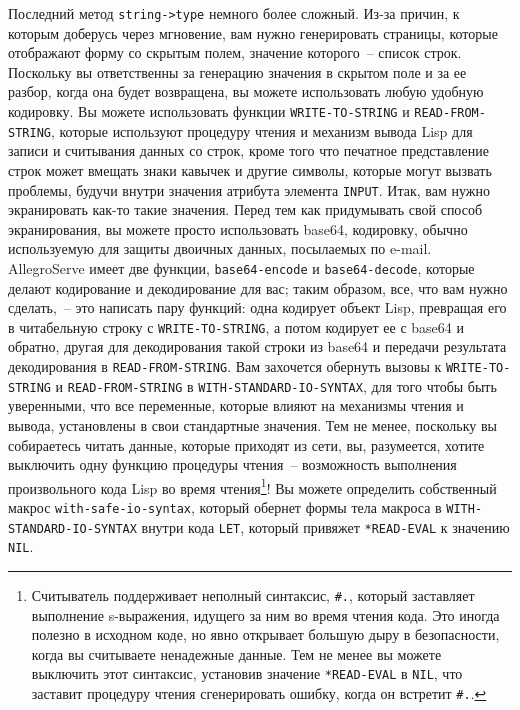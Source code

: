 Последний метод \lstinline{string->type}  немного более сложный. Из-за причин, к которым доберусь
через мгновение, вам нужно генерировать страницы, которые отображают форму со скрытым
полем, значение которого~-- список строк. Поскольку вы ответственны за генерацию значения в
скрытом поле и за ее разбор, когда она будет возвращена, вы можете использовать любую
удобную кодировку. Вы можете использовать функции \lstinline{WRITE-TO-STRING} и
\lstinline{READ-FROM-STRING}, которые используют процедуру чтения и механизм вывода Lisp для записи
и считывания данных со строк, кроме того что печатное представление строк может вмещать
знаки кавычек и другие символы, которые могут вызвать проблемы, будучи внутри значения
атрибута элемента \lstinline{INPUT}. Итак, вам нужно экранировать как-то такие значения. Перед
тем как придумывать свой способ экранирования, вы можете просто использовать base64,
кодировку, обычно используемую для защиты двоичных данных, посылаемых по e-mail. AllegroServe
имеет две функции, \lstinline{base64-encode} и \lstinline{base64-decode}, которые делают кодирование
и декодирование для вас; таким образом, все, что вам нужно сделать,~-- это написать пару
функций: одна кодирует объект Lisp, превращая его в читабельную строку с
\lstinline{WRITE-TO-STRING}, а потом кодирует ее с base64 и обратно, другая для декодирования
такой строки из base64 и передачи результата декодирования в \lstinline{READ-FROM-STRING}. Вам
захочется обернуть вызовы к \lstinline{WRITE-TO-STRING} и \lstinline{READ-FROM-STRING} в
\lstinline{WITH-STANDARD-IO-SYNTAX}, для того чтобы быть уверенными, что все переменные, которые
влияют на механизмы чтения и вывода, установлены в свои стандартные значения. Тем не менее,
поскольку вы собираетесь читать данные, которые приходят из сети, вы, разумеется, хотите
выключить одну функцию процедуры чтения~-- возможность выполнения произвольного кода Lisp во
время чтения\footnote{Считыватель поддерживает неполный синтаксис, \lstinline!#.!,
который заставляет выполнение s-выражения, идущего за ним во время чтения кода. Это иногда
полезно в исходном коде, но явно открывает большую дыру в безопасности, когда вы считываете
ненадежные данные. Тем не менее вы можете выключить этот синтаксис, установив значение
\lstinline{*READ-EVAL} в \lstinline{NIL}, что заставит процедуру чтения сгенерировать ошибку, когда он
встретит \lstinline!#.!.}\hspace{\footnotenegspace}! Вы можете определить собственный макрос
\lstinline{with-safe-io-syntax}, который обернет формы тела макроса в
\lstinline{WITH-STANDARD-IO-SYNTAX} внутри кода \lstinline{LET}, который привяжет \lstinline{*READ-EVAL} к
значению \lstinline{NIL}.

